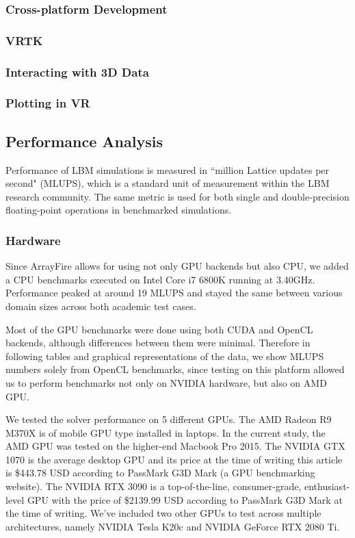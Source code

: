 \subsubsection{Cross-platform Development}

\subsubsection{VRTK} %

\subsubsection{Interacting with 3D Data}

\subsubsection{Plotting in VR}


\subsection{Performance Analysis}

Performance of LBM simulations is measured in ``million Lattice updates per second" (MLUPS), which is a standard unit of measurement within the LBM research community. The same metric is used for both single and double-precision floating-point operations in benchmarked simulations. 

\subsubsection{Hardware}
Since ArrayFire allows for using not only GPU backends but also CPU, we added a CPU benchmarks executed on Intel Core i7 6800K running at 3.40GHz. Performance peaked at around 19 MLUPS and stayed the same between various domain sizes across both academic test cases.

Most of the GPU benchmarks were done using both CUDA and OpenCL backends, although differences between them were minimal. Therefore in following tables and graphical representations of the data, we show MLUPS numbers solely from OpenCL benchmarks, since testing on this platform allowed us to perform benchmarks not only on NVIDIA hardware, but also on AMD GPU.

We tested the solver performance on 5 different GPUs. The AMD Radeon R9 M370X is of mobile GPU type installed in laptops. In the current study, the AMD GPU was tested on the higher-end Macbook Pro 2015. The NVIDIA GTX 1070 is the average desktop GPU and its price at the time of writing this article is \$443.78 USD according to PassMark G3D Mark (a GPU benchmarking website). The NVIDIA RTX 3090 is a top-of-the-line, consumer-grade, enthusiast-level GPU with the price of \$2139.99 USD according to PassMark G3D Mark at the time of writing. We've included two other GPUs to test across multiple architectures, namely NVIDIA Tesla K20c and NVIDIA GeForce RTX 2080 Ti.

